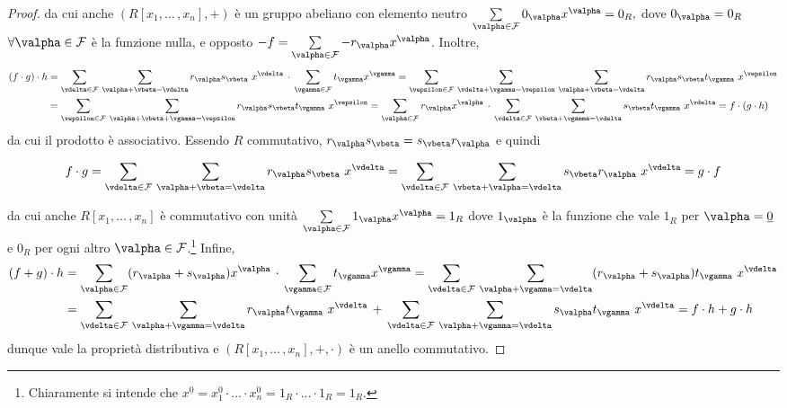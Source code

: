 \begin{proof}
  \noindent da cui anche $(R[x_1,...\,,x_n],+)$ è un gruppo abeliano con elemento neutro $\sum\limits_{\valpha\in \mathcal{F}} 0_{\valpha}x^{\valpha}=0_R,$ 
  dove $0_{\valpha}=0_R$ $\forall \valpha\in \mathcal{F}$ è la funzione nulla, e opposto $-f=\sum\limits_{\valpha\in \mathcal{F}} -r_{\valpha}x^{\valpha}$. 
  Inoltre, 
  \begin{align*}\left(f\cdot g\right) \cdot h &= \sum\limits_{\vdelta\in \mathcal{F}}\, 
    \sum\limits_{\valpha+\vbeta=\vdelta} r_{\valpha}s_{\vbeta} \ x^{\vdelta}\,\cdot\,
    \sum\limits_{\vgamma\in \mathcal{F}} t_{\vgamma}x^{\vgamma}=\sum\limits_{\vepsilon\in \mathcal{F}} \, 
    \sum\limits_{\vdelta+\vgamma=\vepsilon} \, \sum\limits_{\valpha+\vbeta=\vdelta} r_{\valpha}s_{\vbeta}t_{\vgamma} \ x^{\vepsilon} \\ 
    &= \sum\limits_{\vepsilon\in \mathcal{F}} \,\sum\limits_{\valpha+\vbeta+\vgamma=\vepsilon} r_{\valpha}s_{\vbeta}t_{\vgamma} 
    \ x^{\vepsilon} = \sum\limits_{\valpha\in \mathcal{F}} r_{\valpha}x^{\valpha} \, \cdot \, \sum\limits_{\vdelta\in \mathcal{F}}\, 
    \sum\limits_{\vbeta+\vgamma=\vdelta} s_{\vbeta}t_{\vgamma} \ x^{\vdelta}=f\cdot \left(g\cdot h\right)
  \end{align*} 
  \noindent da cui il prodotto è associativo. Essendo $R$ commutativo, $r_{\valpha}s_{\vbeta}=s_{\vbeta}r_{\valpha}$ e quindi 

  \[ f\cdot g=\sum\limits_{\vdelta\in \mathcal{F}}\, \sum\limits_{\valpha+\vbeta=\vdelta} r_{\valpha}s_{\vbeta} 
  \ x^{\vdelta}=\sum\limits_{\vdelta\in \mathcal{F}}\, \sum\limits_{\vbeta+\valpha=\vdelta} s_{\vbeta}r_{\valpha} 
  \ x^{\vdelta}=g\cdot f\] 

  \noindent da cui anche $R[x_1,...\,,x_n]$ è commutativo con unità $\sum\limits_{\valpha\in\mathcal{F}} 1_{\valpha}x^{\valpha}=1_R$ 
  dove $1_{\valpha}$ è la funzione che vale $1_R$ per $\valpha=\underline{0}$ e $0_R$ per ogni altro $\valpha \in \mathcal{F}$.\footnote{Chiaramente 
  si intende che $x^{\underline{0}}=x_1^0\cdot ...\cdot x_n^0=1_R\cdot ...\cdot 1_R=1_R$.} 
  Infine, 
  \begin{align*}
    \left(f+g\right) \cdot h &= \sum\limits_{\valpha\in \mathcal{F}}(r_{\valpha}+s_{\valpha}) x^{\valpha} \, \cdot \, 
    \sum\limits_{\vgamma\in \mathcal{F}} t_{\vgamma}x^{\vgamma}= \sum\limits_{\vdelta\in \mathcal{F}}\, 
    \sum\limits_{\valpha+\vgamma=\vdelta} (r_{\valpha}+s_{\valpha})t_{\vgamma} \ x^{\vdelta} \\ 
    &= \sum\limits_{\vdelta\in \mathcal{F}}\, \sum\limits_{\valpha+\vgamma=\vdelta} r_{\valpha}t_{\vgamma} \ 
    x^{\vdelta}\,+\,\sum\limits_{\vdelta\in \mathcal{F}}\, \sum\limits_{\valpha+\vgamma=\vdelta} s_{\valpha}t_{\vgamma} \ 
    x^{\vdelta} = f\cdot h+g\cdot h
  \end{align*} 
  dunque vale la proprietà distributiva e $(R[x_1,...\,,x_n],+,\cdot)$ è un anello commutativo.
\end{proof}

